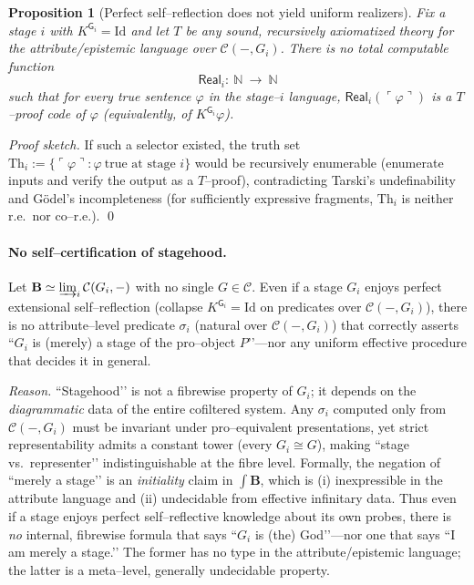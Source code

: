\documentclass[11pt]{article}
\theoremstyle{upright}
\newtheorem{proposition}{Proposition}
\begin{document}
\begin{proposition}[Perfect self–reflection does not yield uniform realizers]\label{prop:no-uniform-realizers}
Fix a stage $i$ with $K^{\mathsf G_i}=\mathrm{Id}$ and let $T$ be any sound, recursively axiomatized theory for the attribute/epistemic language over $\mathcal C(-,G_i)$. There is no total computable function
\[
\mathsf{Real}_i:\ \mathbb N\ \longrightarrow\ \mathbb N
\]
such that for every true sentence $\varphi$ in the stage–$i$ language, $\mathsf{Real}_i(\ulcorner\varphi\urcorner)$ is a $T$–proof code of $\varphi$ (equivalently, of $K^{\mathsf G_i}\varphi$).
\end{proposition}

\noindent\emph{Proof sketch.} If such a selector existed, the truth set $\mathrm{Th}_i:=\{\ulcorner\varphi\urcorner:\varphi\ \text{true at stage }i\}$ would be recursively enumerable (enumerate inputs and verify the output as a $T$–proof), contradicting Tarski’s undefinability and Gödel’s incompleteness (for sufficiently expressive fragments, $\mathrm{Th}_i$ is neither r.e.\ nor co–r.e.). \qed

\paragraph{No self–certification of stagehood.}
Let $\mathbf B\simeq \varinjlim_i \mathcal C(G_i,-)$ with no single $G\in\mathcal C$. Even if a stage $G_i$ enjoys perfect extensional self–reflection (collapse $K^{\mathsf G_i}=\mathrm{Id}$ on predicates over $\mathcal C(-,G_i)$), there is no attribute–level predicate $\sigma_i$ (natural over $\mathcal C(-,G_i)$) that correctly asserts “$G_i$ is (merely) a stage of the pro–object $P$’’—nor any uniform effective procedure that decides it in general.

\emph{Reason.} “Stagehood’’ is not a fibrewise property of $G_i$; it depends on the \emph{diagrammatic} data of the entire cofiltered system. Any $\sigma_i$ computed only from $\mathcal C(-,G_i)$ must be invariant under pro–equivalent presentations, yet strict representability admits a constant tower (every $G_i\cong G$), making “stage vs.\ representer’’ indistinguishable at the fibre level. Formally, the negation of “merely a stage’’ is an \emph{initiality} claim in $\int\!\mathbf B$, which is (i) inexpressible in the attribute language and (ii) undecidable from effective infinitary data. Thus even if a stage enjoys perfect self–reflective knowledge about its own probes, there is \emph{no} internal, fibrewise formula that says “$G_i$ is (the) God’’—nor one that says “I am merely a stage.’’ The former has no type in the attribute/epistemic language; the latter is a meta–level, generally undecidable property.
\end{document}
